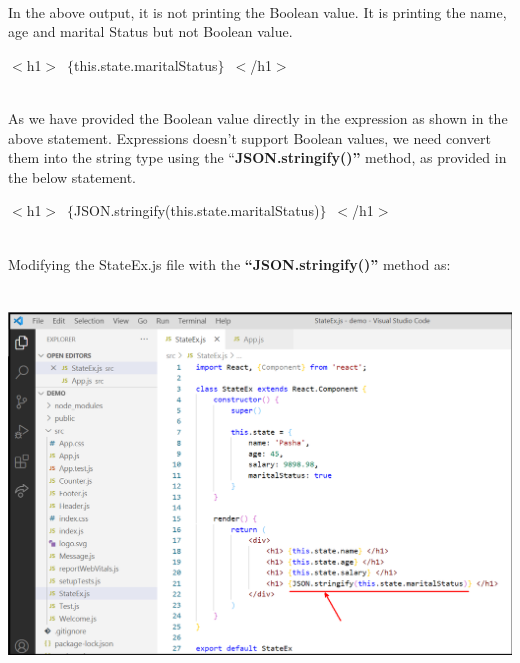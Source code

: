 \documentclass{article}
\begin{document}
\noindent 

\noindent \\
In the above output, it is not printing the Boolean value. It is printing the name, age and marital Status but not Boolean value.\\


\noindent 

\noindent $\mathrm{<}$h1$\mathrm{>}$~$\mathrm{\{}$this.state.maritalStatus$\mathrm{\}}$~$\mathrm{<}$/h1$\mathrm{>}$

\noindent 

\noindent \\
As we have provided the Boolean value directly in the expression as shown in the above statement. Expressions doesn't support Boolean values, we need convert them into the string type using the ``\textbf{JSON.stringify()''} method, as provided in the below statement.\\


\noindent 

\noindent $\mathrm{<}$h1$\mathrm{>}$~$\mathrm{\{}$JSON.stringify(this.state.maritalStatus)$\mathrm{\}}$~$\mathrm{<}$/h1$\mathrm{>}$

\noindent 

\noindent 

\noindent \\
Modifying the StateEx.js file with the \textbf{``JSON.stringify()''} method as:

\begin{center}
	\noindent \includegraphics*[width=5.98in, height=4.07in]{IMG-09-05}
\end{center}
\end{document}
